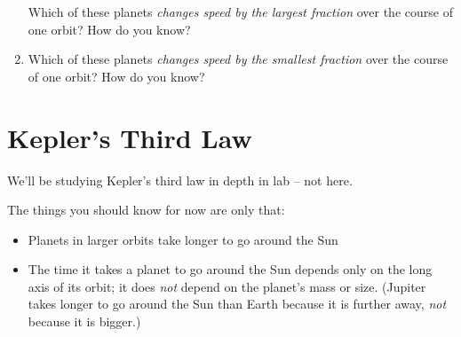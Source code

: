 \documentclass[12pt]{article}
\newcommand{\BI}{\begin{itemize}}
\newcommand{\EI}{\end{itemize}}
\begin{document}
\begin{enumerate}
Which of these planets {\it changes speed by the largest fraction} over the course of one orbit? How do you know?

\vspace{1in}

\item Which of these planets {\it changes speed by the smallest fraction} over the course of one orbit? How do you know?


\end{enumerate}

\section{Kepler's Third Law}

We'll be studying Kepler's third law in depth in lab -- not here.

The things you should know for now are only that:

\BI
\item Planets in larger orbits take longer to go around the Sun
\item The time it takes a planet to go around the Sun depends only on the long axis of its orbit; it does {\it not} depend on the planet's mass or size. (Jupiter takes longer to go around the Sun than Earth because it is further away, {\it not} because it is bigger.)
\EI
\end{document}
